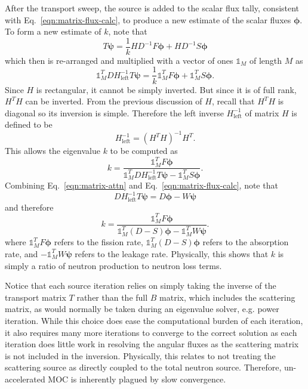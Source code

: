 After the transport sweep, the source is added to the scalar flux tally, consistent with Eq.~\ref{eqn:matrix-flux-calc}, to produce a new estimate of the scalar fluxes $\boldsymbol{\phi}$. To form a new estimate of $k$, note that
\begin{equation}
T \boldsymbol{\psi} = \frac{1}{k} H D^{-1} F \boldsymbol{\phi} + H D^{-1} S \boldsymbol{\phi}
\end{equation}
which then is re-arranged and multiplied with a vector of ones $\mathbb{1}_M$ of length $M$ as
\begin{equation}
\mathbb{1}_M^T D H_{\text{left}}^{-1} T \boldsymbol{\psi}  = \frac{1}{k} \mathbb{1}_M^T  F \boldsymbol{\phi} + \mathbb{1}_M^T  S \boldsymbol{\phi}.
\end{equation}
Since $H$ is rectangular, it cannot be simply inverted. But since it is of full rank, $H^T H$ can be inverted. From the previous discussion of $H$, recall that $H^T H$ is diagonal so its inversion is simple. Therefore the left inverse $H_{\text{left}}^{-1}$ of matrix $H$ is defined to be
\begin{equation}
H_{\text{left}}^{-1} = \left(H^T H\right)^{-1} H^T.
\end{equation}
This allows the eigenvalue $k$ to be computed as
\begin{equation}
k = \frac{\mathbb{1}_M^T F \boldsymbol{\phi}}{\mathbb{1}_M^T  D H_{\text{left}}^{-1} T \boldsymbol{\psi} - \mathbb{1}_M^T S \boldsymbol{\phi}}.
\end{equation}
Combining Eq.~\ref{eqn:matrix-attn} and Eq.~\ref{eqn:matrix-flux-calc}, note that
\begin{equation}
D H_{\text{left}}^{-1} T \boldsymbol{\psi} = D \boldsymbol{\phi} - W \boldsymbol{\psi}
\end{equation}
and therefore
\begin{equation}
k = \frac{\mathbb{1}_M^T F \boldsymbol{\phi}}{\mathbb{1}_M^T \left(D - S \right) \boldsymbol{\phi} - \mathbb{1}_M^T W \boldsymbol{\psi}}.
\end{equation}
where $\mathbb{1}_M^T F \boldsymbol{\phi}$ refers to the fission rate, $\mathbb{1}_M^T \left(D - S \right) \boldsymbol{\phi}$ refers to the absorption rate, and $-\mathbb{1}_M^T W \boldsymbol{\psi}$ refers to the leakage rate. Physically, this shows that $k$ is simply a ratio of neutron production to neutron loss terms.

Notice that each source iteration relies on simply taking the inverse of the transport matrix $T$ rather than the full $B$ matrix, which includes the scattering matrix, as would normally be taken during an eigenvalue solver, e.g. power iteration. While this choice does ease the computational burden of each iteration, it also requires many more iterations to converge to the correct solution as each iteration does little work in resolving the angular fluxes as the scattering matrix is not included in the inversion. Physically, this relates to not treating the scattering source as directly coupled to the total neutron source. Therefore, un-accelerated \ac{MOC} is inherently plagued by slow convergence. 

